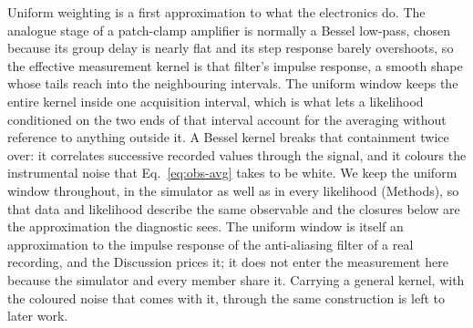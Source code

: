 Uniform weighting is a first approximation to what the electronics do. The analogue stage of a
patch-clamp amplifier is normally a Bessel low-pass, chosen because its group delay is nearly
flat and its step response barely overshoots, so the effective measurement kernel is that
filter's impulse response, a smooth shape whose tails reach into the neighbouring intervals.
The uniform window keeps the entire kernel inside one acquisition interval, which is what lets a
likelihood conditioned on the two ends of that interval account for the averaging without
reference to anything outside it. A Bessel kernel breaks that containment twice over: it
correlates successive recorded values through the signal, and it colours the instrumental noise
that Eq.~\ref{eq:obs-avg} takes to be white. We keep the uniform window throughout, in the
simulator as well as in every likelihood (Methods), so that data and likelihood describe the same
observable and the closures below are the approximation the diagnostic sees. The uniform window is
itself an approximation to the impulse response of the anti-aliasing filter of a real recording, and
the Discussion prices it; it does not enter the measurement here because the simulator and every
member share it. Carrying a general kernel, with the coloured noise that comes with it, through
the same construction is left to later work.
%
%
